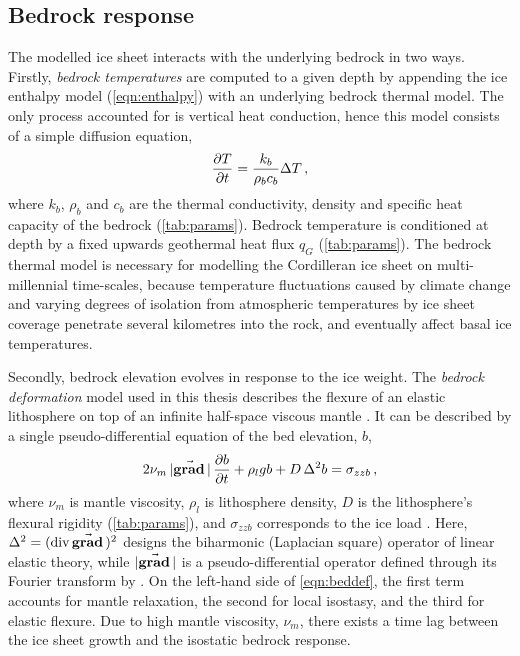 \documentclass[a4paper]{kappa}
\newcommand{\vect}[1]{\va*{#1}} %
\renewcommand{\div}[1]{\mathrm{div}\,#1}            %
\renewcommand{\grad}[1]{\vect{\mathrm{grad}}\,#1}   %
\begin{document}
\subsection{Bedrock response}

The modelled ice sheet interacts with the underlying bedrock in two ways.
Firstly, \emph{bedrock temperatures} are computed to a given depth by
appending the
ice enthalpy model (\ref{eqn:enthalpy}) with an underlying bedrock thermal
model. The only process accounted for is vertical heat conduction, hence this model
consists of a simple diffusion equation,
\begin{equation}
    \pdv{T}{t} = \frac{k_b}{\rho_b c_b} \Delta T \,,
\end{equation}
where $k_b$, $\rho_b$ and $c_b$ are the thermal conductivity, density and
specific heat capacity of the bedrock (\cref{tab:params}).
Bedrock temperature is conditioned at depth by a fixed upwards geothermal heat
flux $q_G$  (\cref{tab:params}). The bedrock thermal model
is necessary for modelling the Cordilleran ice sheet on multi-millennial
time-scales, because temperature fluctuations caused by climate change and
varying degrees of isolation from atmospheric temperatures by ice sheet
coverage penetrate several kilometres
into the rock, and eventually affect basal ice temperatures.

Secondly, bedrock elevation evolves in response to the ice weight. The
\emph{bedrock deformation} model used in this thesis describes the flexure of
an elastic
lithosphere on top of an infinite half-space viscous mantle
\citep{Lingle.Clark.1985}. It can be described by a single pseudo-differential
equation of the bed elevation, $b$,
\begin{equation}
    \label{eqn:beddef}
    2\nu_m\,|\grad|\,\pdv{b}{t} + \rho_l g b + D\,\Delta^2 b = \sigma_{zzb} \,,
\end{equation}
where $\nu_m$ is mantle viscosity, $\rho_l$ is lithosphere density, $D$ is the
lithosphere's flexural rigidity (\cref{tab:params}), and $\sigma_{zzb}$
corresponds to the ice load
\citep{Bueler.etal.2007}. Here, ${\Delta^2 = (\div\grad{})^2}$ designs the
biharmonic (Laplacian square) operator of
linear elastic theory, while $|\grad{}|$ is a pseudo-differential operator
defined through its Fourier transform by \citet[Eq.~6]{Bueler.etal.2007}. On
the left-hand side of \cref{eqn:beddef}, the first term accounts for mantle
relaxation, the second for local isostasy, and the third for elastic
flexure. Due to high mantle viscosity, $\nu_m$, there exists a time lag between
the ice sheet growth and the isostatic bedrock response.
\end{document}
